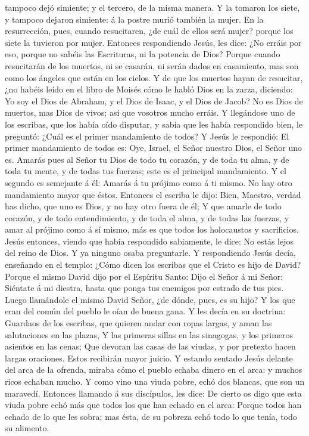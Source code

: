 tampoco dejó simiente; y el tercero, de la misma manera. 
Y la tomaron los siete, y tampoco dejaron simiente: á la postre murió
también la mujer.  En la resurrección, pues, cuando
resucitaren, ¿de cuál de ellos será mujer? porque los siete la tuvieron
por mujer.  Entonces respondiendo Jesús, les dice: ¿No
erráis por eso, porque no sabéis las Escrituras, ni la potencia de Dios?
 Porque cuando resucitarán de los muertos, ni se casarán,
ni serán dados en casamiento, mas son como los ángeles que están en los
cielos.  Y de que los muertos hayan de resucitar, ¿no
habéis leído en el libro de Moisés cómo le habló Dios en la zarza,
diciendo: Yo soy el Dios de Abraham, y el Dios de Isaac, y el Dios de
Jacob?  No es Dios de muertos, mas Dios de vivos; así que
vosotros mucho erráis.  Y llegándose uno de los escribas,
que los había oído disputar, y sabía que les había respondido bien, le
preguntó: ¿Cuál es el primer mandamiento de todos?  Y
Jesús le respondió: El primer mandamiento de todos es: Oye, Israel, el
Señor nuestro Dios, el Señor uno es.  Amarás pues al
Señor tu Dios de todo tu corazón, y de toda tu alma, y de toda tu mente,
y de todas tus fuerzas; este es el principal mandamiento.
 Y el segundo es semejante á él: Amarás á tu prójimo como
á ti mismo. No hay otro mandamiento mayor que éstos. 
Entonces el escriba le dijo: Bien, Maestro, verdad has dicho, que uno es
Dios, y no hay otro fuera de él;  Y que amarle de todo
corazón, y de todo entendimiento, y de toda el alma, y de todas las
fuerzas, y amar al prójimo como á sí mismo, más es que todos los
holocaustos y sacrificios.  Jesús entonces, viendo que
había respondido sabiamente, le dice: No estás lejos del reino de Dios.
Y ya ninguno osaba preguntarle.  Y respondiendo Jesús
decía, enseñando en el templo: ¿Cómo dicen los escribas que el Cristo es
hijo de David?  Porque el mismo David dijo por el
Espíritu Santo: Dijo el Señor á mi Señor: Siéntate á mi diestra, hasta
que ponga tus enemigos por estrado de tus pies.  Luego
llamándole el mismo David Señor, ¿de dónde, pues, es su hijo? Y los que
eran del común del pueblo le oían de buena gana.  Y les
decía en su doctrina: Guardaos de los escribas, que quieren andar con
ropas largas, y aman las salutaciones en las plazas,  Y
las primeras sillas en las sinagogas, y los primeros asientos en las
cenas;  Que devoran las casas de las viudas, y por
pretexto hacen largas oraciones. Estos recibirán mayor juicio.
 Y estando sentado Jesús delante del arca de la ofrenda,
miraba cómo el pueblo echaba dinero en el arca: y muchos ricos echaban
mucho.  Y como vino una viuda pobre, echó dos blancas,
que son un maravedí.  Entonces llamando á sus discípulos,
les dice: De cierto os digo que esta viuda pobre echó más que todos los
que han echado en el arca:  Porque todos han echado de lo
que les sobra; mas ésta, de su pobreza echó todo lo que tenía, todo su
alimento.

